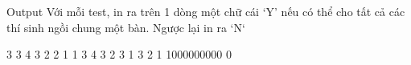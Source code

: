 Output
Với mỗi test, in ra trên 1 dòng một chữ cái ‘Y’ nếu có thể cho tất cả các thí sinh ngồi chung một bàn. Ngược lại in ra ‘N‘

3 3 4 3 2 2 1 1 3 4 3 2 3 1 3 2 1 1000000000 0